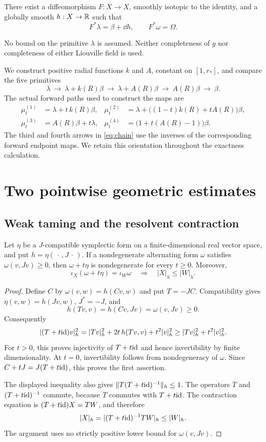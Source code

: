 \begin{theorem}\label{thm:main}
There exist a diffeomorphism $F:X\to X$, smoothly isotopic to
the identity, and a globally smooth $h:X\to\mathbb R$ such that
\[
 F^*\lambda=\beta+\dd h,\qquad F^*\omega=\Omega.
\]
\end{theorem}
No bound on the primitive $\lambda$ is assumed. Neither completeness
of $g$ nor completeness of either Liouville field is used.

We construct positive radial functions $k$ and $A$, constant on
$[1,r_*]$, and compare the five primitives
\begin{equation}\label{eq:chain}
 \lambda\ \longrightarrow\ \lambda+k(R)\beta\
 \longrightarrow\ \lambda+A(R)\beta\
 \longrightarrow\ A(R)\beta\ \longrightarrow\ \beta .
\end{equation}
The actual forward paths used to construct the maps are
\begin{align}
 \mu^{(1)}_t&=\lambda+t\,k(R)\beta, &
 \mu^{(2)}_t&=\lambda+\bigl((1-t)k(R)+tA(R)\bigr)\beta,\nonumber\\
 \mu^{(3)}_t&=A(R)\beta+t\lambda, &
 \mu^{(4)}_t&=\bigl(1+t(A(R)-1)\bigr)\beta .
 \label{eq:fourpaths}
\end{align}
The third and fourth arrows in \eqref{eq:chain} use the inverses
of the corresponding forward endpoint maps. We retain this
orientation throughout the exactness calculation.

\section{Two pointwise geometric estimates}
\subsection{Weak taming and the resolvent contraction}
\begin{lemma}\label{lem:linear}
Let $\eta$ be a $J$-compatible symplectic form on a finite-dimensional
real vector space, and put $h=\eta(\,\cdot\,,J\,\cdot\,)$.
If a nondegenerate alternating form $\omega$ satisfies
$\omega(v,Jv)\ge0$, then $\omega+t\eta$ is nondegenerate for every
$t\ge0$. Moreover,
\[
 \iota_X(\omega+t\eta)=\iota_W\omega
 \quad\Longrightarrow\quad |X|_h\le |W|_h .
\]
\end{lemma}
\begin{proof}
Define $C$ by $\omega(v,w)=h(Cv,w)$ and put $T=-JC$.
Compatibility gives $\eta(v,w)=h(Jv,w)$, $J^*=-J$, and
\[
 h(Tv,v)=h(Cv,Jv)=\omega(v,Jv)\ge0.
\]
Consequently
\[
 |(T+t\mathrm{id})v|_h^2
 =|Tv|_h^2+2t\,h(Tv,v)+t^2|v|_h^2
 \ge |Tv|_h^2+t^2|v|_h^2 .
\]
For $t>0$, this proves injectivity of $T+t\mathrm{id}$ and hence
invertibility by finite dimensionality. At $t=0$, invertibility
follows from nondegeneracy of $\omega$.
Since $C+tJ=J(T+t\mathrm{id})$, this proves the first assertion.

The displayed inequality also gives
$\|T(T+t\mathrm{id})^{-1}\|_h\le1$.
The operators $T$ and $(T+t\mathrm{id})^{-1}$ commute, because $T$
commutes with $T+t\mathrm{id}$. The contraction equation is
$(T+t\mathrm{id})X=TW$, and therefore
\[
 |X|_h=|(T+t\mathrm{id})^{-1}TW|_h\le|W|_h.
\]
The argument uses no strictly positive lower bound for
$\omega(v,Jv)$.
\end{proof}


